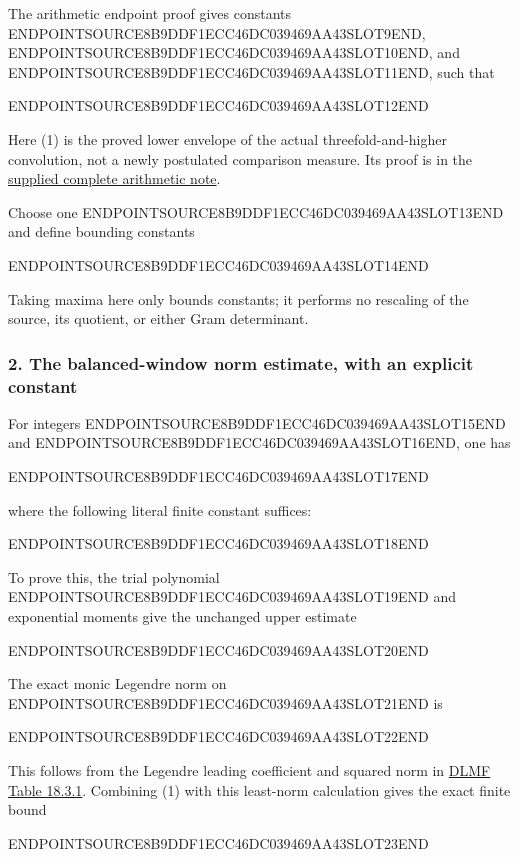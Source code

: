 The arithmetic endpoint proof gives constants ENDPOINTSOURCE8B9DDF1ECC46DC039469AA43SLOT9END, ENDPOINTSOURCE8B9DDF1ECC46DC039469AA43SLOT10END, and ENDPOINTSOURCE8B9DDF1ECC46DC039469AA43SLOT11END, such that

ENDPOINTSOURCE8B9DDF1ECC46DC039469AA43SLOT12END

Here (1) is the proved lower envelope of the actual threefold-and-higher convolution, not a newly postulated comparison measure. Its proof is in the \href{delivery/NOTE.tex}{supplied complete arithmetic note}.

Choose one ENDPOINTSOURCE8B9DDF1ECC46DC039469AA43SLOT13END and define bounding constants

ENDPOINTSOURCE8B9DDF1ECC46DC039469AA43SLOT14END

Taking maxima here only bounds constants; it performs no rescaling of the source, its quotient, or either Gram determinant.

\subsubsection{2. The balanced-window norm estimate, with an explicit constant}\label{endpoint-four_volume_threshold--the-balanced-window-norm-estimate-with-an-explicit-constant}

For integers ENDPOINTSOURCE8B9DDF1ECC46DC039469AA43SLOT15END and ENDPOINTSOURCE8B9DDF1ECC46DC039469AA43SLOT16END, one has

ENDPOINTSOURCE8B9DDF1ECC46DC039469AA43SLOT17END

where the following literal finite constant suffices:

ENDPOINTSOURCE8B9DDF1ECC46DC039469AA43SLOT18END

To prove this, the trial polynomial ENDPOINTSOURCE8B9DDF1ECC46DC039469AA43SLOT19END and exponential moments give the unchanged upper estimate

ENDPOINTSOURCE8B9DDF1ECC46DC039469AA43SLOT20END

The exact monic Legendre norm on ENDPOINTSOURCE8B9DDF1ECC46DC039469AA43SLOT21END is

ENDPOINTSOURCE8B9DDF1ECC46DC039469AA43SLOT22END

This follows from the Legendre leading coefficient and squared norm in \href{https://dlmf.nist.gov/18.3\#T1}{DLMF Table 18.3.1}. Combining (1) with this least-norm calculation gives the exact finite bound

ENDPOINTSOURCE8B9DDF1ECC46DC039469AA43SLOT23END

